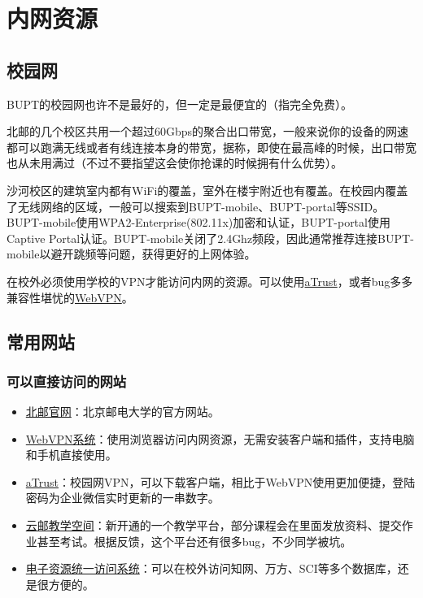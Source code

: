 \section{内网资源}

\subsection{校园网}

BUPT的校园网也许不是最好的，但一定是最便宜的（指完全免费）。

北邮的几个校区共用一个超过60Gbps的聚合出口带宽，一般来说你的设备的网速都可以跑满无线或者有线连接本身的带宽，据称，即使在最高峰的时候，出口带宽也从未用满过（不过不要指望这会使你抢课的时候拥有什么优势）。

沙河校区的建筑室内都有WiFi的覆盖，室外在楼宇附近也有覆盖。在校园内覆盖了无线网络的区域，一般可以搜索到BUPT-mobile、BUPT-portal等SSID。BUPT-mobile使用WPA2-Enterprise(802.11x)加密和认证，BUPT-portal使用Captive Portal认证。BUPT-mobile关闭了2.4Ghz频段，因此通常推荐连接BUPT-mobile以避开跳频等问题，获得更好的上网体验。

在校外必须使用学校的VPN才能访问内网的资源。可以使用\href{https://vpn.bupt.edu.cn/}{aTrust}，或者bug多多兼容性堪忧的\href{https://webvpn.bupt.edu.cn/}{WebVPN}。

\subsection{常用网站}

\subsubsection*{可以直接访问的网站}
\begin{itemize}
    \item \href{https://www.bupt.edu.cn/}{北邮官网}：北京邮电大学的官方网站。
    \item \href{https://webvpn.bupt.edu.cn/}{WebVPN系统}：使用浏览器访问内网资源，无需安装客户端和插件，支持电脑和手机直接使用。
    \item \href{https://vpn.bupt.edu.cn/}{aTrust}：校园网VPN，可以下载客户端，相比于WebVPN使用更加便捷，登陆密码为企业微信实时更新的一串数字。
    \item \href{https://ucloud.bupt.edu.cn/}{云邮教学空间}：新开通的一个教学平台，部分课程会在里面发放资料、提交作业甚至考试。根据反馈，这个平台还有很多bug，不少同学被坑。
    \item \href{https://libcon.bupt.edu.cn/}{电子资源统一访问系统}：可以在校外访问知网、万方、SCI等多个数据库，还是很方便的。
\end{itemize}

